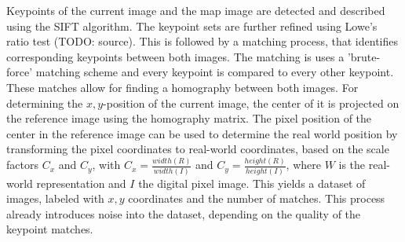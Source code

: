 Keypoints of the current image and the map image are detected and
described using the SIFT algorithm. The keypoint sets are further refined using Lowe's ratio test (TODO: source). This is followed by a matching
process, that identifies corresponding keypoints between both
images. The matching is uses a 'brute-force' matching scheme and every keypoint is compared to every other keypoint. These matches allow for finding a homography between both
images. For determining the $x, y$-position of the current image, the
center of it is projected on the reference image using the homography
matrix. The pixel position of the center in the reference image can be
used to determine the real world position by transforming the pixel
coordinates to real-world coordinates, based on the scale factors
$C_x$ and $C_y$, with $C_x = \frac{width(R)}{width(I)}$ and
$C_y = \frac{height(R)}{height(I)}$, where $W$ is the real-world
representation and $I$ the digital pixel image. This yields a dataset
of images, labeled with $x, y$ coordinates and the number of
matches. This process already introduces noise into the dataset, depending on the quality of the keypoint matches.